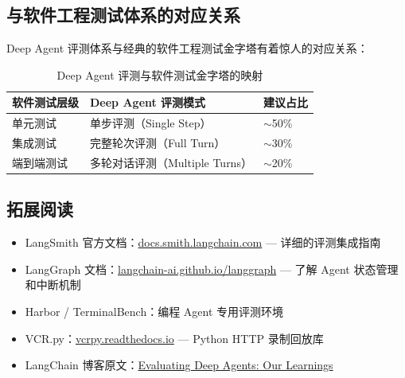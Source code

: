 \documentclass[a4paper]{article}
\begin{document}
\subsection{与软件工程测试体系的对应关系}

Deep Agent 评测体系与经典的软件工程测试金字塔有着惊人的对应关系：

\begin{table}[H]
\centering
\caption{Deep Agent 评测与软件测试金字塔的映射}
\begin{tabular}{lll}
\toprule
\textbf{软件测试层级} & \textbf{Deep Agent 评测模式} & \textbf{建议占比} \\
\midrule
单元测试 & 单步评测（Single Step） & $\sim$50\% \\
集成测试 & 完整轮次评测（Full Turn） & $\sim$30\% \\
端到端测试 & 多轮对话评测（Multiple Turns） & $\sim$20\% \\
\bottomrule
\end{tabular}
\end{table}

\subsection{拓展阅读}

\begin{itemize}
  \item LangSmith 官方文档：\href{https://docs.smith.langchain.com/}{docs.smith.langchain.com} --- 详细的评测集成指南
  \item LangGraph 文档：\href{https://langchain-ai.github.io/langgraph/}{langchain-ai.github.io/langgraph} --- 了解 Agent 状态管理和中断机制
  \item Harbor / TerminalBench：编程 Agent 专用评测环境
  \item VCR.py：\href{https://vcrpy.readthedocs.io/}{vcrpy.readthedocs.io} --- Python HTTP 录制回放库
  \item LangChain 博客原文：\href{https://blog.langchain.com/evaluating-deep-agents-our-learnings/}{Evaluating Deep Agents: Our Learnings}
\end{itemize}

\end{document}
